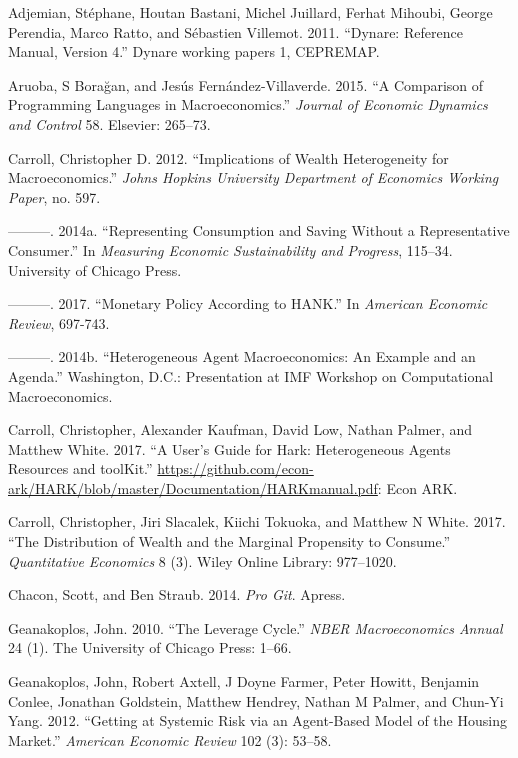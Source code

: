 \message{ !name(ccarroll_et_al_scipy_2018.tex)}\documentclass[10pt,twocolumn]{article}
\begin{document}
\hypertarget{refs}{}
\hypertarget{ref-adjemian2011dynare}{}
Adjemian, Stéphane, Houtan Bastani, Michel Juillard, Ferhat Mihoubi,
George Perendia, Marco Ratto, and Sébastien Villemot. 2011. ``Dynare:
Reference Manual, Version 4.'' Dynare working papers 1, CEPREMAP.

\hypertarget{ref-aruoba2015comparison}{}
Aruoba, S Borağan, and Jesús Fernández-Villaverde. 2015. ``A Comparison
of Programming Languages in Macroeconomics.'' \emph{Journal of Economic
Dynamics and Control} 58. Elsevier: 265--73.

\hypertarget{ref-carroll2012implications}{}
Carroll, Christopher D. 2012. ``Implications of Wealth Heterogeneity for
Macroeconomics.'' \emph{Johns Hopkins University Department of Economics
Working Paper}, no. 597.

\hypertarget{ref-carroll2014representing}{}
---------. 2014a. ``Representing Consumption and Saving Without a
Representative Consumer.'' In \emph{Measuring Economic Sustainability
and Progress}, 115--34. University of Chicago Press.

\hypertarget{ref-kmvHANK}{}
---------. 2017. ``Monetary Policy According to HANK.'' In \emph{American Economic Review}, 697-743. 

\hypertarget{ref-carroll2014imfheterogeneousagentmacro}{}
---------. 2014b. ``Heterogeneous Agent Macroeconomics: An Example and
an Agenda.'' Washington, D.C.: Presentation at IMF Workshop on
Computational Macroeconomics.

\hypertarget{ref-carroll2017harkmanual}{}
Carroll, Christopher, Alexander Kaufman, David Low, Nathan Palmer, and
Matthew White. 2017. ``A User's Guide for Hark: Heterogeneous Agents
Resources and toolKit.''
\url{https://github.com/econ-ark/HARK/blob/master/Documentation/HARKmanual.pdf}:
Econ ARK.

\hypertarget{ref-carroll2017distribution}{}
Carroll, Christopher, Jiri Slacalek, Kiichi Tokuoka, and Matthew N
White. 2017. ``The Distribution of Wealth and the Marginal Propensity to
Consume.'' \emph{Quantitative Economics} 8 (3). Wiley Online Library:
977--1020.

\hypertarget{ref-chacon2014pro}{}
Chacon, Scott, and Ben Straub. 2014. \emph{Pro Git}. Apress.

\hypertarget{ref-geanakoplos2010leverage}{}
Geanakoplos, John. 2010. ``The Leverage Cycle.'' \emph{NBER
Macroeconomics Annual} 24 (1). The University of Chicago Press: 1--66.

\hypertarget{ref-geanakoplos2012getting}{}
Geanakoplos, John, Robert Axtell, J Doyne Farmer, Peter Howitt, Benjamin
Conlee, Jonathan Goldstein, Matthew Hendrey, Nathan M Palmer, and
Chun-Yi Yang. 2012. ``Getting at Systemic Risk via an Agent-Based Model
of the Housing Market.'' \emph{American Economic Review} 102 (3):
53--58.
\end{document}
